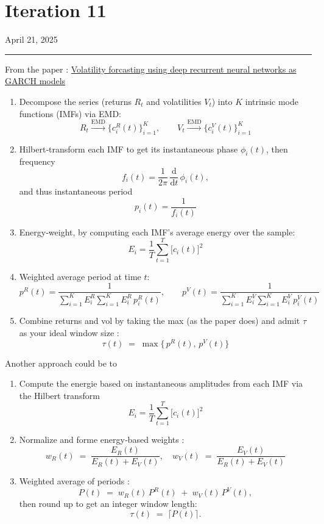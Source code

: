 \documentclass[letterpaper,11pt]{article}
\begin{document}
\newpage
\section*{Iteration 11}
\begin{flushright}
April 21, 2025
\end{flushright}
\hrule
\vspace{0.2in}

From the paper : \href{https://link.springer.com/content/pdf/10.1007/s00180-023-01349-1.pdf}{Volatility forcasting using deep recurrent neural networks as GARCH models}\\


\begin{enumerate}
  \item Decompose the series (returns $R_t$ and volatilities $V_t$) into $K$ intrinsic mode functions (IMFs) via EMD:
  \[
    R_t \xrightarrow{\mathrm{EMD}} \bigl\{c_i^R(t)\bigr\}_{i=1}^K,
    \qquad
    V_t \xrightarrow{\mathrm{EMD}} \bigl\{c_i^V(t)\bigr\}_{i=1}^K
  \]

  \item Hilbert‐transform each IMF to get its instantaneous phase $\phi_i(t)$, then frequency
  \[
    f_i(t)
    = \frac{1}{2\pi}\,\frac{\mathrm{d}}{\mathrm{d}t}\,\phi_i(t),
  \]
  and thus instantaneous period
  \[
    p_i(t) = \frac{1}{f_i(t)}
  \]

  \item Energy‐weight, by computing each IMF’s average energy over the sample:
  \[
    E_i = \frac{1}{T} \sum_{t=1}^{T} \bigl[c_i(t)\bigr]^2
  \]

  \item Weighted average period at time $t$:
  \[
    p^R(t)
    = \frac{1}{\sum_{i=1}^K E_i^R \sum_{i=1}^K E_i^R\,p_i^R(t)},
    \qquad
    p^V(t)
    = \frac{1}{\sum_{i=1}^K E_i^V \sum_{i=1}^K E_i^V\,p_i^V(t)}
  \]

  \item Combine returns and vol by taking the max (as the paper does) and admit $\tau $ as your ideal window size :
  \[
    \tau(t) \;=\; \max\bigl\{\,p^R(t),\,p^V(t)\bigr\}
  \]
\end{enumerate}

Another approach could be to 
\bigskip

\begin{enumerate}
  \item Compute the energie based on instantaneous amplitudes from each IMF via the Hilbert transform
  \[
    E_i = \frac{1}{T} \sum_{t=1}^{T} \bigl[c_i(t)\bigr]^2
  \]

  \item Normalize and forme energy‐based weights :
  \[
    w_R(t) \;=\; \frac{E_R(t)}{E_R(t) + E_V(t)},
    \quad
    w_V(t) \;=\; \frac{E_V(t)}{E_R(t) + E_V(t)}%
  \]

  \item Weighted average of periods :
  \[
    P(t)
      \;=\;
    w_R(t)\,P^R(t)\;+\;w_V(t)\,P^V(t),
  \]
  then round up to get an integer window length:
  \[
    \tau(t)
      \;=\;
    \bigl\lceil P(t)\bigr\rceil.
  \]
\end{enumerate}
\end{document}
